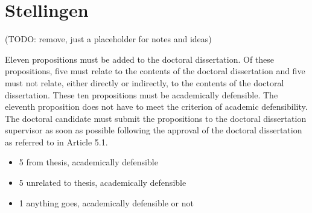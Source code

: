 \chapter*{Stellingen}

(TODO: remove, just a placeholder for notes and ideas)


Eleven propositions must be added to the doctoral dissertation. Of these propositions,
five must relate to the contents of the doctoral dissertation and five must not relate,
either directly or indirectly, to the contents of the doctoral dissertation. These ten
propositions must be academically defensible. The eleventh proposition does not have
to meet the criterion of academic defensibility. The doctoral candidate must submit the
propositions to the doctoral dissertation supervisor as soon as possible following the
approval of the doctoral dissertation as referred to in Article 5.1.

\begin{itemize}
\item 5 from thesis, academically defensible
\item 5 unrelated to thesis, academically defensible
\item 1 anything goes, academically defensible or not
\end{itemize}

\begin{comment}
ideas

\begin{itemize}
\item This manuscript
    \begin{itemize}
    \item Training is pivotal

    \end{itemize}
\item Academia
    \begin{itemize}
     \item Scientists should write up results for general public as well as scientific journals
     \item Open science FTW, no more paywalled journals or use money to pay peer reviewers to do thorough testing or professional reviewers.
     \item Do we even need journals? system of completely open peer review could replace
     \item post-publication public peer review FTW
    \end{itemize}
\end{itemize}
\end{comment}
